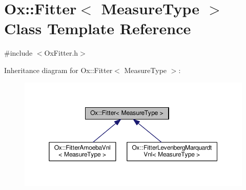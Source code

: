 \hypertarget{class_ox_1_1_fitter}{\section{Ox\-:\-:Fitter$<$ Measure\-Type $>$ Class Template Reference}
\label{class_ox_1_1_fitter}
}


{\ttfamily \#include $<$Ox\-Fitter.\-h$>$}



Inheritance diagram for Ox\-:\-:Fitter$<$ Measure\-Type $>$\-:
\nopagebreak
\begin{figure}[H]
\begin{center}
\leavevmode
\includegraphics[width=350pt]{class_ox_1_1_fitter__inherit__graph}
\end{center}
\end{figure}
